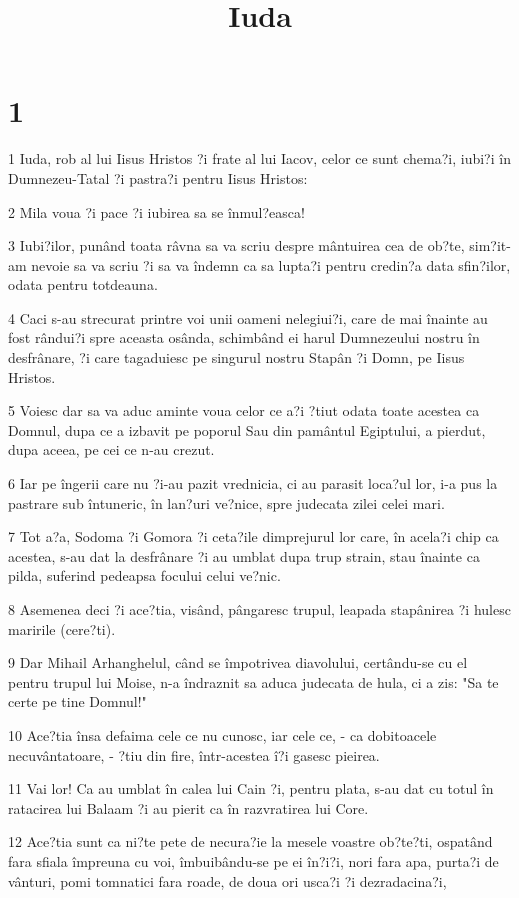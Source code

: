 

\title{Iuda}


\chapter{1}

\par 1 Iuda, rob al lui Iisus Hristos ?i frate al lui Iacov, celor ce sunt chema?i, iubi?i în Dumnezeu-Tatal ?i pastra?i pentru Iisus Hristos:
\par 2 Mila voua ?i pace ?i iubirea sa se înmul?easca!
\par 3 Iubi?ilor, punând toata râvna sa va scriu despre mântuirea cea de ob?te, sim?it-am nevoie sa va scriu ?i sa va îndemn ca sa lupta?i pentru credin?a data sfin?ilor, odata pentru totdeauna.
\par 4 Caci s-au strecurat printre voi unii oameni nelegiui?i, care de mai înainte au fost rândui?i spre aceasta osânda, schimbând ei harul Dumnezeului nostru în desfrânare, ?i care tagaduiesc pe singurul nostru Stapân ?i Domn, pe Iisus Hristos.
\par 5 Voiesc dar sa va aduc aminte voua celor ce a?i ?tiut odata toate acestea ca Domnul, dupa ce a izbavit pe poporul Sau din pamântul Egiptului, a pierdut, dupa aceea, pe cei ce n-au crezut.
\par 6 Iar pe îngerii care nu ?i-au pazit vrednicia, ci au parasit loca?ul lor, i-a pus la pastrare sub întuneric, în lan?uri ve?nice, spre judecata zilei celei mari.
\par 7 Tot a?a, Sodoma ?i Gomora ?i ceta?ile dimprejurul lor care, în acela?i chip ca acestea, s-au dat la desfrânare ?i au umblat dupa trup strain, stau înainte ca pilda, suferind pedeapsa focului celui ve?nic.
\par 8 Asemenea deci ?i ace?tia, visând, pângaresc trupul, leapada stapânirea ?i hulesc maririle (cere?ti).
\par 9 Dar Mihail Arhanghelul, când se împotrivea diavolului, certându-se cu el pentru trupul lui Moise, n-a îndraznit sa aduca judecata de hula, ci a zis: "Sa te certe pe tine Domnul!"
\par 10 Ace?tia însa defaima cele ce nu cunosc, iar cele ce, - ca dobitoacele necuvântatoare, - ?tiu din fire, într-acestea î?i gasesc pieirea.
\par 11 Vai lor! Ca au umblat în calea lui Cain ?i, pentru plata, s-au dat cu totul în ratacirea lui Balaam ?i au pierit ca în razvratirea lui Core.
\par 12 Ace?tia sunt ca ni?te pete de necura?ie la mesele voastre ob?te?ti, ospatând fara sfiala împreuna cu voi, îmbuibându-se pe ei în?i?i, nori fara apa, purta?i de vânturi, pomi tomnatici fara roade, de doua ori usca?i ?i dezradacina?i,
